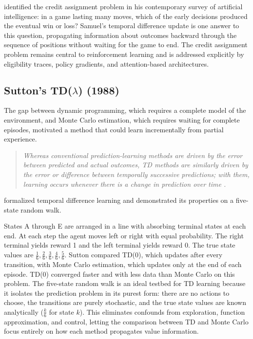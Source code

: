 \citet{Minsky1961} identified the credit assignment problem in his contemporary survey of artificial intelligence: in a game lasting many moves, which of the early decisions produced the eventual win or loss? Samuel's temporal difference update is one answer to this question, propagating information about outcomes backward through the sequence of positions without waiting for the game to end. The credit assignment problem remains central to reinforcement learning and is addressed explicitly by eligibility traces, policy gradients, and attention-based architectures.

\subsection{Sutton's TD($\lambda$) (1988)}

The gap between dynamic programming, which requires a complete model of the environment, and Monte Carlo estimation, which requires waiting for complete episodes, motivated a method that could learn incrementally from partial experience.

\begin{quote}\itshape
Whereas conventional prediction-learning methods are driven by the error between predicted and actual outcomes, TD methods are similarly driven by the error or difference between temporally successive predictions; with them, learning occurs whenever there is a change in prediction over time \citep{sutton1988}.
\end{quote}

\citet{sutton1988} formalized temporal difference learning and demonstrated its properties on a five-state random walk.

States A through E are arranged in a line with absorbing terminal states at each end. At each step the agent moves left or right with equal probability. The right terminal yields reward 1 and the left terminal yields reward 0. The true state values are $\frac{1}{6}, \frac{2}{6}, \frac{3}{6}, \frac{4}{6}, \frac{5}{6}$. Sutton compared TD(0), which updates after every transition, with Monte Carlo estimation, which updates only at the end of each episode. TD(0) converged faster and with less data than Monte Carlo on this problem. The five-state random walk is an ideal testbed for TD learning because it isolates the prediction problem in its purest form: there are no actions to choose, the transitions are purely stochastic, and the true state values are known analytically ($\frac{k}{6}$ for state $k$). This eliminates confounds from exploration, function approximation, and control, letting the comparison between TD and Monte Carlo focus entirely on how each method propagates value information.

